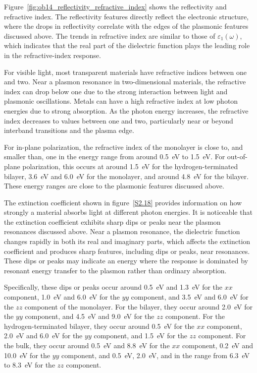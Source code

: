 Figure~\ref{fig:ob14_reflectivity_refractive_index} shows the reflectivity and refractive index.
The reflectivity features directly reflect the electronic structure,
where the drops in reflectivity correlate with the edges of the plasmonic features discussed above.
The trends in refractive index are similar to those of $\varepsilon_{1}(\omega)$,
which indicates that the real part of the dielectric function plays the leading role in the refractive-index response.

For visible light, most transparent materials have refractive indices between one and two.
Near a plasmon resonance in two-dimensional materials,
the refractive index can drop below one due to the strong interaction between light and plasmonic oscillations.
Metals can have a high refractive index at low photon energies due to strong absorption.
As the photon energy increases, the refractive index decreases to values between one and two,
particularly near or beyond interband transitions and the plasma edge.

For in-plane polarization, the refractive index of the monolayer is close to,
and smaller than, one in the energy range from around \qty{0.5}{\electronvolt} to \qty{1.5}{\electronvolt}.
For out-of-plane polarization, this occurs at around \qty{1.5}{\electronvolt} for the hydrogen-terminated bilayer,
\qty{3.6}{\electronvolt} and \qty{6.0}{\electronvolt} for the monolayer,
and around \qty{4.8}{\electronvolt} for the bilayer.
These energy ranges are close to the plasmonic features discussed above.

The extinction coefficient shown in figure~\ref{S2.18} provides information on how strongly a material absorbs light at different photon energies.
It is noticeable that the extinction coefficient exhibits sharp dips or peaks near the plasmon resonances discussed above.
Near a plasmon resonance,
the dielectric function changes rapidly in both its real and imaginary parts,
which affects the extinction coefficient and produces sharp features,
including dips or peaks, near resonances.
These dips or peaks may indicate an energy where the response is dominated by resonant energy transfer to the plasmon rather than ordinary absorption.

Specifically, these dips or peaks occur around \qty{0.5}{\electronvolt} and \qty{1.3}{\electronvolt} for the $xx$ component,
\qty{1.0}{\electronvolt} and \qty{6.0}{\electronvolt} for the $yy$ component,
and \qty{3.5}{\electronvolt} and \qty{6.0}{\electronvolt} for the $zz$ component of the monolayer.
For the bilayer, they occur around \qty{2.0}{\electronvolt} for the $yy$ component,
and \qty{4.5}{\electronvolt} and \qty{9.0}{\electronvolt} for the $zz$ component.
For the hydrogen-terminated bilayer, they occur around \qty{0.5}{\electronvolt} for the $xx$ component,
\qty{2.0}{\electronvolt} and \qty{6.0}{\electronvolt} for the $yy$ component,
and \qty{1.5}{\electronvolt} for the $zz$ component.
For the bulk, they occur around \qty{0.5}{\electronvolt} and \qty{8.8}{\electronvolt} for the $xx$ component,
\qty{0.2}{\electronvolt} and \qty{10.0}{\electronvolt} for the $yy$ component,
and \qty{0.5}{\electronvolt}, \qty{2.0}{\electronvolt},
and in the range from \qty{6.3}{\electronvolt} to \qty{8.3}{\electronvolt} for the $zz$ component.

